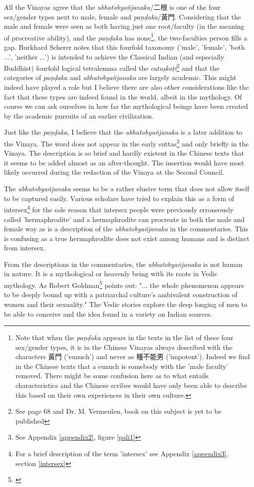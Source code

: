 All the Vinayas agree that the {\em ubhatob­yañ­janaka}/二根 is one of the four sex/gender types next to male, female and {\em paṇḍaka}/黃門. Considering that the male and female were seen as both having just one root/faculty (in the meaning of procreative ability), and the {\em paṇḍaka} has none\footnote{Note that when the {\em paṇḍaka} appears in the texts in the list of these four sex/gender types, it is in the Chinese Vinayas always described with the characters 黃門 ('eunuch') and never as 種不能男 ('impotent'). Indeed we find in the Chinese texts that a eunuch is somebody with the 'male faculty' removed. There might be some confusion here as to what entails characteristics and the Chinese scribes would have only been able to describe this based on their own experiences in their own culture.}, the two-faculties person fills a gap. Burkhard Scherer notes that this fourfold taxonomy ('male', 'female', 'both ...', 'neither ...') is intended to achieve the Classical Indian (and especially Buddhist) fourfold logical tetralemma called the {\em catuṣkoṭi}\footnote{See \cite{scherer} page 68 and Dr. M. Vermeulen, book on this subject is yet to be published} and that the categories of {\em paṇḍaka} and {\em ubhatob­yañ­janaka} are largely academic. This might indeed have played a role but I believe there are also other considerations like the fact that these types are indeed found in the world, albeit in the mythology. Of course we can ask ourselves in how far the mythological beings have been created by the academic pursuits of an earlier civilization. 

Just like the {\em paṇḍaka}, I believe that the {\em ubhatob­yañ­janaka} is a later addition to the Vinaya. The word does not appear in the early suttas\footnote{See Appendix \ref{appendix2}, figure \ref{pali1}} and only briefly in the Vinaya. The description is so brief and hardly existent in the Chinese texts that it seems to be added almost as an after-thought. The insertion would have most likely occurred during the redaction of the Vinaya at the Second Council.

The {\em ubhatob­yañ­janaka} seems to be a rather elusive term that does not allow itself to be captured easily. Various scholars have tried to explain this as a form of intersex\footnote{For a brief description of the term 'intersex' see Appendix \ref{appendix3}, section \ref{intersex}} for the sole reason that intersex people were previously erroneously called 'hermaphrodite' and a hermaphrodite can procreate in both the male and female way as is a description of the {\em ubhatob­yañ­janaka} in the commentaries. This is confusing as a true hermaphrodite does not exist among humans and is distinct from intersex. 

From the descriptions in the commentaries, the {\em ubhatob­yañ­janaka} is not human in nature. It is a mythological or heavenly being with its roots in  Vedic mythology. As Robert Goldman\footnote{\cite{goldman}} points out: "... the whole phenomenon appears to be deeply bound up with a patriarchal culture's ambivalent construction of women and their sexuality." The Vedic stories explore the deep longing of men to be able to conceive and the idea found in a variety on Indian sources.

